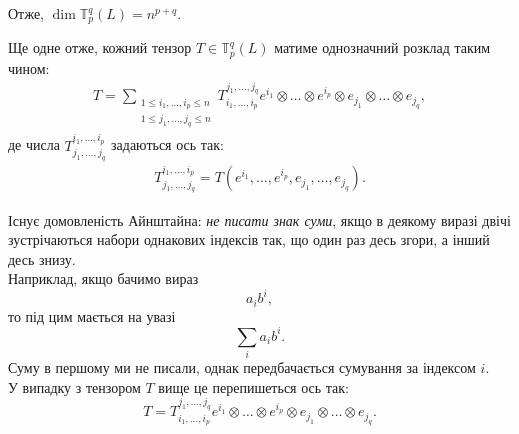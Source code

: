 \documentclass{math_library}
\begin{document}
\begin{remark}
Отже, $\dim \mathbb{T}_p^q(L) = n^{p+q}$.
\end{remark}

\begin{remark}
Ще одне отже, кожний тензор $T \in \mathbb{T}_p^q(L)$ матиме однозначний розклад таким чином:
\begin{align*}
T = \displaystyle\sum_{\substack{1 \leq i_1,\dots,i_p \leq n \\ 1 \leq j_1,\dots,j_q \leq n}} T_{i_1,\dots,i_p}^{j_1,\dots,j_q} e^{i_1} \otimes \dots \otimes e^{i_p} \otimes e_{j_1} \otimes \dots \otimes e_{j_q},
\end{align*}
де числа $T_{j_1,\dots,j_q}^{i_1,\dots,i_p}$ задаються ось так:
\begin{align*}
T_{j_1,\dots,j_q}^{i_1,\dots,i_p} = T(e^{i_1},\dots,e^{i_p},e_{j_1},\dots,e_{j_q}).
\end{align*}
\end{remark}

\begin{remark}
Існує домовленість Айнштайна: \textit{не писати знак суми}, якщо в деякому виразі двічі зустрічаються набори однакових індексів так, що один раз десь згори, а інший десь знизу.\\
Наприклад, якщо бачимо вираз
\[
a_i b^i,
\]
то під цим мається на увазі
\[
\sum_i a_i b^i.
\] 
Суму в першому ми не писали, однак передбачається сумування за індексом $i$.\\
У випадку з тензором $T$ вище це перепишеться ось так: 
\[
T = T_{i_1,\dots,i_p}^{j_1,\dots,j_q} e^{i_1} \otimes \dots \otimes e^{i_p} \otimes e_{j_1} \otimes \dots \otimes e_{j_q}.
\]
\end{remark}
\end{document}
